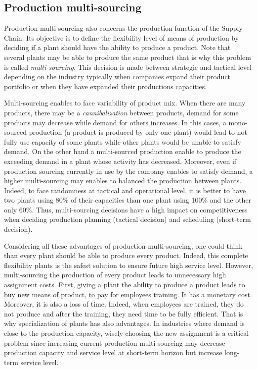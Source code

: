 \subsection{Production multi-sourcing}
\label{sec:business-context:argon:multi-sourcing}


Production multi-sourcing also concerns the production function of the Supply Chain.
Its objective is to define the flexibility level of means of production by deciding if a plant should have the ability to produce a product.
Note that several plants may be able to produce the same product that is why this problem is called \emph{multi-sourcing}.
This decision is made between strategic and tactical level depending on the industry typically when companies expand their product portfolio or when they have expanded their productions capacities.


Multi-sourcing enables to face variability of product mix.
When there are many products, there may be a \emph{cannibalization} between products, \ie demand for some products may decrease while demand for others increases.
In this cases, a mono-sourced production (\ie a product is produced by only one plant) would lead to not fully use capacity of some plants while other plants would be unable to satisfy demand.
On the other hand a multi-sourced production enable to produce the exceeding demand in a plant whose activity has decreased.
Moreover, even if production sourcing currently in use by the company enables to satisfy demand, a higher multi-sourcing may enables to balanced the production between plants.
Indeed, to face randomness at tactical and operational level, it is better to have two plants using 80\% of their capacities than one plant using 100\% and the other only 60\%. 
Thus, multi-sourcing decisions have a high impact on competitiveness when deciding production planning (tactical decision) and scheduling (short-term decision).


Considering all these advantages of production multi-sourcing, one could think than every plant should be able to produce every product.
Indeed, this complete flexibility plants is the safest solution to ensure future high service level.
However, multi-sourcing the production of every product leads to unnecessary high assignment costs.
First, giving a plant the ability to produce a product leads to buy new means of product, to pay for employees training.
It has a monetary cost.
Moreover, it is also a loss of time.
Indeed, when employees are trained, they do not produce and after the training, they need time to be fully efficient.
That is why specialization of plants has also advantages.
In industries where demand is close to the production capacity, wisely choosing the new assignment is a critical problem since increasing current production multi-sourcing may decrease production capacity and service level at short-term horizon but increase long-term service level.


